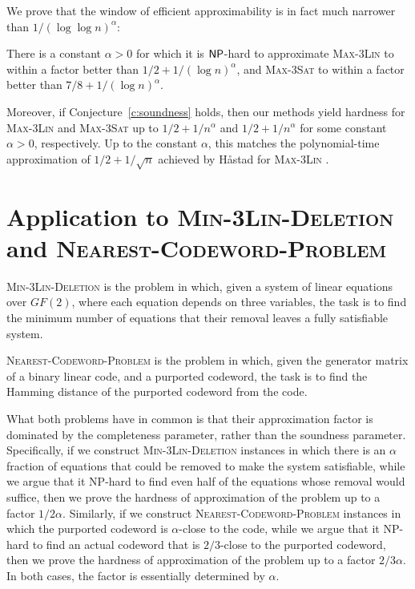 We prove that the window of efficient approximability is in fact much
narrower than $1/(\log\log n)^{\alpha}$:
\begin{theorem} There is a constant $\alpha >0$ for which 
it is ${\sf {\sf NP}}$-hard to approximate \textsc{Max-3Lin} to within a
factor better than $1/2 + 1/(\log n)^{\alpha}$, and \textsc{Max-3Sat}
to within a factor better than $7/8 + 1/(\log n)^{\alpha}$.
\end{theorem}
Moreover, if Conjecture~\ref{c:soundness} holds, then our methods yield hardness
for \textsc{Max-3Lin} and \textsc{Max-3Sat} up to $1/2 + 1/n^{\alpha}$
and $1/2 + 1/n^{\alpha}$ for some constant $\alpha > 0$, respectively.
Up to the constant $\alpha$, this matches the polynomial-time
approximation of $1/2 + 1/\sqrt{n}$ achieved by H{\aa}stad for
\textsc{Max-3Lin} \cite{Has00}.

\section{Application to \textsc{Min-3Lin-Deletion} and \textsc{Nearest-Codeword-Problem}}

\textsc{Min-3Lin-Deletion} is the problem in which, given a system of linear equations over $GF(2)$, where each equation depends on three variables, the task is to find the minimum number of equations that their removal leaves a fully satisfiable system.

\textsc{Nearest-Codeword-Problem} is the problem in which, given the generator matrix of a binary linear code, and a purported codeword, the task is to find the Hamming distance of the purported codeword from the code. 

What both problems have in common is that their approximation factor is dominated by the completeness parameter, rather than the soundness parameter. Specifically, if we construct \textsc{Min-3Lin-Deletion} instances in which there is an $\alpha$ fraction of equations that could be removed to make the system satisfiable, while we argue that it {\sf NP}-hard to find even half of the equations whose removal would suffice, then we prove the hardness of approximation of the problem up to a factor $1/2\alpha$. Similarly, if we construct \textsc{Nearest-Codeword-Problem} instances in which the purported codeword is $\alpha$-close to the code, while we argue that it {\sf NP}-hard to find an actual codeword that is $2/3$-close to the purported codeword, then we prove the hardness of approximation of the problem up to a factor $2/3\alpha$.
In both cases, the factor is essentially determined by $\alpha$. 


